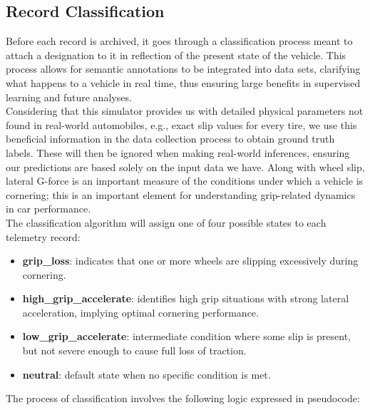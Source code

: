 \documentclass[a4paper,final,12pt]{report}
\begin{document}
\subsection{Record Classification}
Before each record is archived, it goes through a classification process meant to attach a designation to it in reflection of the present state of the vehicle. This process allows for semantic annotations to be integrated into data sets, clarifying what happens to a vehicle in real time, thus ensuring large benefits in supervised learning and future analyses.\\

Considering that this simulator provides us with detailed physical parameters not found in real-world automobiles, e.g., exact slip values for every tire, we use this beneficial information in the data collection process to obtain ground truth labels. These will then be ignored when making real-world inferences, ensuring our predictions are based solely on the input data we have. Along with wheel slip, lateral G-force is an important measure of the conditions under which a vehicle is cornering; this is an important element for understanding grip-related dynamics in car performance.\\

The classification algorithm will assign one of four possible states to each telemetry record:
\begin{itemize}
    \item \textbf{grip\_loss}: indicates that one or more wheels are slipping excessively during cornering.
    \item \textbf{high\_grip\_accelerate}: identifies high grip situations with strong lateral acceleration, implying optimal cornering performance.
    \item \textbf{low\_grip\_accelerate}: intermediate condition where some slip is present, but not severe enough to cause full loss of traction.
    \item \textbf{neutral}: default state when no specific condition is met.
\end{itemize}

\noindent The process of classification involves the following logic expressed in pseudocode:
\end{document}

